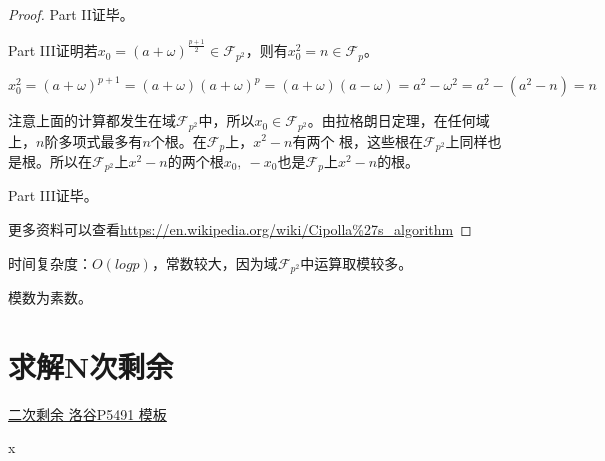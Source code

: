 \begin{proof}
Part II证毕。

\vbox{}

{\heiti Part III\quad 证明若$x_{0}=(a+\omega)^{\frac{p+1}{2}} \in \mathcal{F}_{p^{2}}$，则有$x_{0}^{2}=n \in \mathcal{F}_{p}$。}

$$
x_{0}^{2}=(a+\omega)^{p+1}=(a+\omega)(a+\omega)^{p}=(a+\omega)(a-\omega)=a^{2}-\omega^{2}=a^{2}-\left(a^{2}-n\right)=n
$$

注意上面的计算都发生在域$\mathcal{F}_{p^{2}}$中，所以$x_0\in \mathcal{F}_{p^{2}}$。由拉格朗日定理，在任何域上，$n$阶多项式最多有$n$个根。在$\mathcal{F}_{p}$上，$x^2-n$有两个
根，这些根在$\mathcal{F}_{p^{2}}$上同样也是根。所以在$\mathcal{F}_{p^{2}}$上$x^2-n$的两个根$x_0,\ -x_0$也是$\mathcal{F}_{p}$上$x^2-n$的根。

Part III证毕。

更多资料可以查看\href{https://en.wikipedia.org/wiki/Cipolla\%27s_algorithm}{https://en.wikipedia.org/wiki/Cipolla\%27s\_algorithm}
\end{proof}

\vbox{}

{\heiti 时间复杂度：$O(logp)$，常数较大，因为域$\mathcal{F}_{p^{2}}$中运算取模较多。}

模数为素数。


\section{求解N次剩余}


\begin{problemset}
	\item \href{https://www.luogu.org/problem/P5491}{二次剩余 \quad 洛谷P5491 \quad 模板}
	\item x  
\end{problemset}